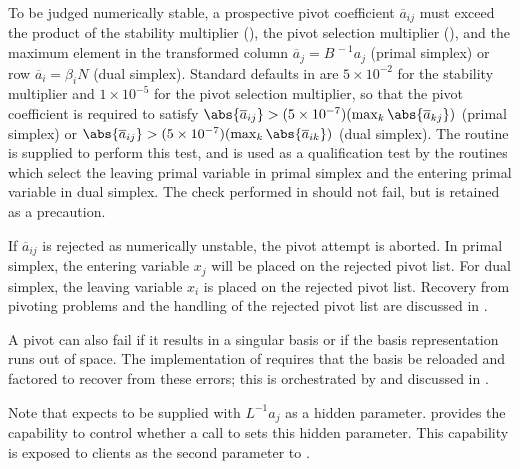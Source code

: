 To be judged numerically stable, a prospective pivot coefficient
$\overline{a}_{ij}$ must exceed the product
of the \glpk stability multiplier (), the \dylp pivot
selection multiplier (),
and the maximum element in the transformed column
$\overline{a}_j = B^{\,-1}a_j$ (primal
simplex) or row $\overline{a}_i = \beta_i N$ (dual simplex).
Standard defaults in \dylp are
$5 \times 10^{-2}$ for the \glpk stability multiplier
and $1 \times 10^{-5}$ for the \dylp pivot selection multiplier, so that
the pivot coefficient is required to satisfy
$\abs{\overline{a}_{ij}} > (5 \times 10^{-7})(\max_k \abs{\overline{a}_{kj}})$
(primal simplex) or
$\abs{\overline{a}_{ij}} > (5 \times 10^{-7})(\max_k \abs{\overline{a}_{ik}})$
(dual simplex).
The routine  is supplied to perform this test, and is used
as a qualification test by the routines which select the leaving primal
variable in primal simplex and the entering primal variable in dual simplex.
The check performed in  should not fail, but is retained as a
precaution.

If $\overline{a}_{ij}$ is rejected as numerically unstable, the pivot attempt
is aborted.
In primal simplex, the entering variable $x_j$ will be placed on the rejected
pivot list.
For dual simplex, the leaving variable $x_i$ is placed on the rejected pivot
list.
Recovery from pivoting problems and the handling of the rejected pivot list are
discussed in .

A pivot can also fail
if it results in a singular basis or if the basis representation runs
out of space.
The implementation of \glpk requires that the basis be reloaded and factored
to recover from these errors; this is orchestrated by 
and discussed in .

Note that  expects to be supplied with $L^{-1}a_j$ as a
hidden parameter.
\glpk provides the capability to control whether a call to 
sets this hidden parameter.
This capability is exposed to clients as the second parameter
to .


